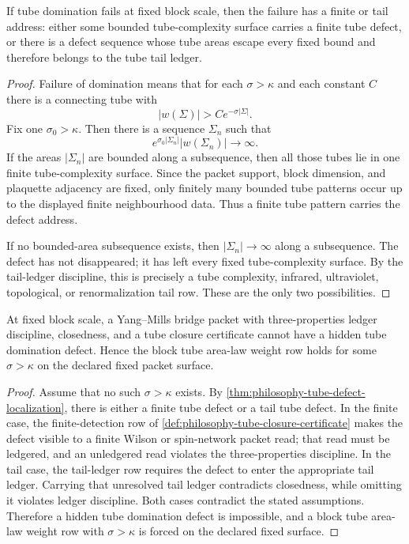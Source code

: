 \begin{theorem}
\label{thm:philosophy-tube-defect-localization}
If tube domination fails at fixed block scale, then the failure has a finite
or tail address: either some bounded tube-complexity surface carries a finite
tube defect, or there is a defect sequence whose tube areas escape every
fixed bound and therefore belongs to the tube tail ledger.
\end{theorem}
\begin{proof}
Failure of domination means that for each $\sigma>\kappa$ and each constant
$C$ there is a connecting tube with
$$
|w(\Sigma)|>Ce^{-\sigma|\Sigma|}.
$$
Fix one $\sigma_0>\kappa$. Then there is a sequence $\Sigma_n$ such that
$$
e^{\sigma_0|\Sigma_n|}|w(\Sigma_n)|\to\infty.
$$
If the areas $|\Sigma_n|$ are bounded along a subsequence, then all those
tubes lie in one finite tube-complexity surface. Since the packet support,
block dimension, and plaquette adjacency are fixed, only finitely many
bounded tube patterns occur up to the displayed finite neighbourhood data.
Thus a finite tube pattern carries the defect address.

If no bounded-area subsequence exists, then $|\Sigma_n|\to\infty$ along a
subsequence. The defect has not disappeared; it has left every fixed
tube-complexity surface. By the tail-ledger discipline, this is precisely a
tube complexity, infrared, ultraviolet, topological, or renormalization tail
row. These are the only two possibilities.
\end{proof}

\begin{theorem}
\label{thm:philosophy-tube-closure-forces-block-area-law}
At fixed block scale, a Yang--Mills bridge packet with three-properties
ledger discipline, closedness, and a tube closure certificate cannot have a
hidden tube domination defect. Hence the block tube area-law weight row holds
for some $\sigma>\kappa$ on the declared fixed packet surface.
\end{theorem}
\begin{proof}
Assume that no such $\sigma>\kappa$ exists. By
\autoref{thm:philosophy-tube-defect-localization}, there is either a finite
tube defect or a tail tube defect. In the finite case, the finite-detection
row of \autoref{def:philosophy-tube-closure-certificate} makes the defect
visible to a finite Wilson or spin-network packet read; that read must be
ledgered, and an unledgered read violates the three-properties discipline.
In the tail case, the tail-ledger row requires the defect to enter the
appropriate tail ledger. Carrying that unresolved tail ledger contradicts
closedness, while omitting it violates ledger discipline. Both cases
contradict the stated assumptions. Therefore a hidden tube domination defect
is impossible, and a block tube area-law weight row with $\sigma>\kappa$ is
forced on the declared fixed surface.
\end{proof}

